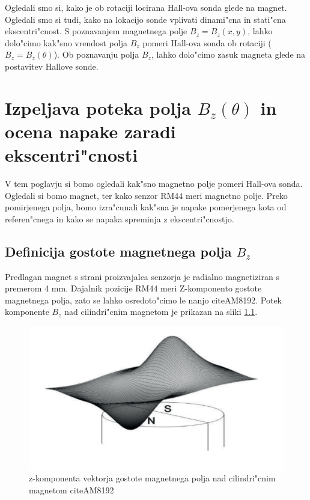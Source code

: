 Ogledali smo si, kako je ob rotaciji locirana Hall-ova sonda glede na magnet. Ogledali smo si tudi, kako na lokacijo sonde vplivati dinami"cna in stati"cna ekscentri"cnost. S poznavanjem magnetnega polje $B_z=B_z(x , y)$, lahko dolo"cimo kak"sno vrendost polja $B_z$ pomeri Hall-ova sonda ob rotaciji ($B_z=B_z(\theta)$). Ob poznavanju polja $B_z$, lahko dolo"cimo zasuk magneta glede na postavitev Hallove sonde.


\chapter{Izpeljava poteka polja $B_z(\theta)$ in ocena napake zaradi ekscentri"cnosti}

V tem poglavju si bomo ogledali kak"sno magnetno polje  pomeri Hall-ova sonda. Ogledali si bomo magnet, ter kako senzor RM44 meri magnetno polje. Preko pomirjenega polja, bomo izra"cunali kak"sna je napake pomerjenega kota od referen"cnega in kako se napaka spreminja z ekscentri"cnostjo.

\section{Definicija  gostote magnetnega polja $B_z$}

Predlagan magnet s strani proizvajalca senzorja je radialno magnetiziran s premerom 4 mm.
Dajalnik pozicije RM44 meri Z-komponento gostote magnetnega polja, zato se lahko osredoto"cimo le nanjo citeAM8192. Potek komponente $B_z$ nad cilindri"cnim magnetom je prikazan na sliki \ref{fig:magnetno_polje}.




\begin{figure}[h]
	\centering
		\includegraphics[width=0.75\columnwidth]{./Slike/magnetno_polje.jpg}
	\caption{z-komponenta vektorja gostote magnetnega polja nad cilindri"cnim magnetom citeAM8192}
	\label{fig:magnetno_polje}
\end{figure}


